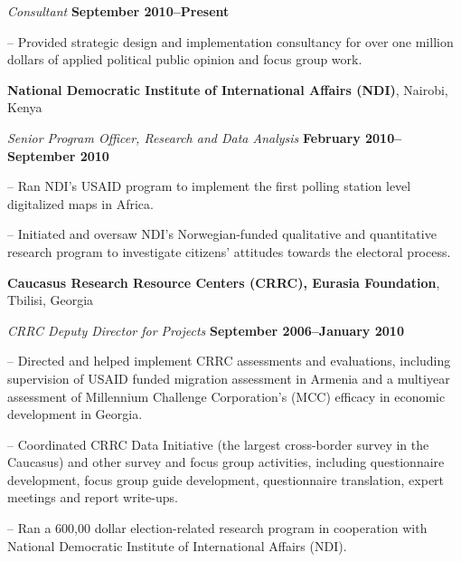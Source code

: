 \documentclass[margin,line]{res}
\newenvironment{list1}{
  \begin{list}{\ding{113}}{%
      \setlength{\itemsep}{0in}
      \setlength{\parsep}{0in} \setlength{\parskip}{0in}
      \setlength{\topsep}{0in} \setlength{\partopsep}{0in} 
      \setlength{\leftmargin}{0.17in}}}{\end{list}}
\begin{document}
{\begin{resume}
\vspace{-.3cm}
{\em Consultant} \hfill {\bf
  September 2010--Present}\\
\begin{list1}
\item[]-- Provided strategic design and implementation consultancy
  for over one million dollars of applied
political public opinion and focus group work.
\end{list1}
{\bf National Democratic Institute of International Affairs (NDI)}, Nairobi, Kenya

\vspace{-.3cm}
{\em Senior Program Officer, Research and Data Analysis} \hfill {\bf
  February 2010--September 2010}\\
\vspace{-.3cm}
\begin{list1} 
\item[]-- Ran NDI's  USAID program to implement the first polling station level
digitalized maps in Africa.
\item[]-- Initiated and oversaw NDI's
Norwegian-funded qualitative and quantitative research program to
investigate citizens' attitudes towards the electoral process.
\end{list1}
{\bf Caucasus Research Resource Centers (CRRC), Eurasia Foundation},
Tbilisi, Georgia

\vspace{-.3cm}
{\em CRRC Deputy Director for Projects} \hfill {\bf
  September 2006--January 2010}\\

\vspace{-.3cm}
\begin{list1} 
\item[]-- Directed and helped implement CRRC assessments and evaluations,
  including supervision of USAID funded migration assessment in
  Armenia and a multiyear assessment of Millennium Challenge
  Corporation's (MCC) efficacy in economic development in
  Georgia. 
\item[]-- Coordinated CRRC Data Initiative (the largest cross-border
  survey in the Caucasus) and other survey and focus group activities,
  including questionnaire development, focus group guide development,
  questionnaire translation, expert meetings and report write-ups. 
\item[]-- Ran a 600,00 dollar election-related research program in
  cooperation with National Democratic Institute of International
  Affairs (NDI).
\end{list1}


\end{resume}}
\end{document}
